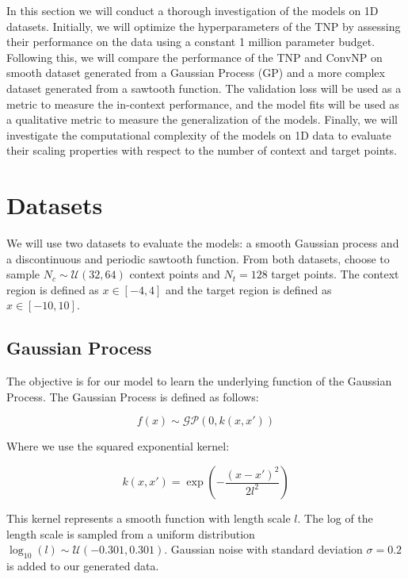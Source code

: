 \documentclass[../../main.tex]{subfiles}
\begin{document}
In this section we will conduct a thorough investigation of the models on 1D datasets. Initially, we will optimize the hyperparameters of the TNP by assessing their performance on the data using a constant 1 million parameter budget. Following this, we will compare the performance of the TNP and ConvNP on smooth dataset generated from a Gaussian Process (GP) \parencite{books/lib/RasmussenW06} and a more complex dataset generated from a sawtooth function. The validation loss will be used as a metric to measure the in-context performance, and the model fits will be used as a qualitative metric to measure the generalization of the models. Finally, we will investigate the computational complexity of the models on 1D data to evaluate their scaling properties with respect to the number of context and target points.

\section{Datasets}

We will use two datasets to evaluate the models: a smooth Gaussian process and a discontinuous and periodic sawtooth function. From both datasets, choose to sample $N_c \sim \mathcal{U}(32, 64)$ context points and $N_t = 128$ target points. The context region is defined as $x \in [-4, 4]$ and the target region is defined as $x \in [-10, 10]$. 

\subsection{Gaussian Process}
\label{sec:1d-gp-dataset}

 The objective is for our model to learn the underlying function of the Gaussian Process. The Gaussian Process is defined as follows:

\begin{equation}
	f(x) \sim \mathcal{GP}(0, k(x, x'))
\end{equation}

Where we use the squared exponential kernel:

\begin{equation}
	k(x, x') = \exp\left(-\frac{(x - x')^2}{2l^2}\right)
\end{equation}

This kernel represents a smooth function with length scale $l$. The log of the length scale is sampled from a uniform distribution $\log_{10}(l) \sim \mathcal{U}(-0.301, 0.301)$. Gaussian noise with standard deviation $\sigma = 0.2$ is added to our generated data. 
\end{document}
